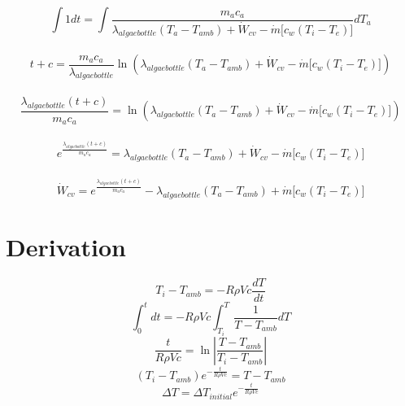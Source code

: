 \documentclass[10pt,a4paper]{ieeetran}
\begin{document}
\begin{enumerate}
		$$\int 1 dt = \int \frac{m_a c_a}{\lambda_{algaebottle} \left( T_a - T_{amb} \right) + \dot{W}_{cv} - \dot{m} \lbrack c_w \left( T_i - T_e \right) \rbrack} dT_a$$ \\
		$$t+ c = \frac{m_a c_a}{\lambda_{algaebottle}} \ln(\lambda_{algaebottle} \left( T_a - T_{amb} \right) + \dot{W}_{cv} - \dot{m} \lbrack c_w \left( T_i - T_e \right) \rbrack)$$ \\
		$$\frac{\lambda_{algaebottle} \left( t + c \right)}{m_a c_a} = \ln(\lambda_{algaebottle} \left( T_a - T_{amb} \right) + \dot{W}_{cv} - \dot{m} \lbrack c_w \left( T_i - T_e \right) \rbrack)$$ \\
		$$e^{\frac{\lambda_{algaebottle} \left( t + c \right)}{m_a c_a}} = \lambda_{algaebottle} \left( T_a - T_{amb} \right) + \dot{W}_{cv} - \dot{m} \lbrack c_w \left( T_i - T_e \right) \rbrack$$ \\
		$$\dot{W}_{cv} = e^{\frac{\lambda_{algaebottle} \left( t + c \right)}{m_a c_a}} - \lambda_{algaebottle} \left( T_a - T_{amb} \right) + \dot{m} \lbrack c_w \left( T_i - T_e \right) \rbrack$$
	\end{enumerate}
	
	\section{Derivation}
	$$T_i - T_{amb} = -R \rho V c \frac{dT}{dt}$$
	$$\int_{0}^{t} dt = -R \rho V c \int_{T_i}^{T}\frac{1}{T-T_{amb}} dT$$
	$$\frac{t}{R \rho V c} = \ln \left| \frac{T - T_{amb}}{T_i - T_{amb}} \right|$$
	$$\left( T_i - T_{amb} \right) e^{-\frac{t}{R \rho V c}} = T - T_{amb}$$
	$$\Delta T = \Delta T_{initial} e^{-\frac{t}{R \rho V c}}$$
	
	
	
\end{document}
